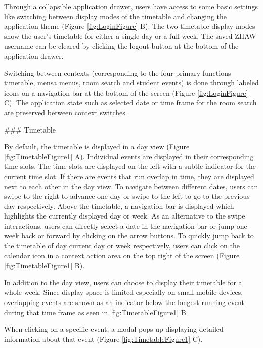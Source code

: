 \begin{markdown}
Through a collapsible application drawer, users have access to some basic settings like switching between display modes of the timetable and changing the application theme (Figure \ref{fig:LoginFigure} B). The two timetable display modes show the user's timetable for either a single day or a full week. The saved ZHAW username can be cleared by clicking the logout button at the bottom of the application drawer.

Switching between contexts (corresponding to the four primary functions timetable, mensa menus, room search and student events) is done through labeled icons on a navigation bar at the bottom of the screen (Figure \ref{fig:LoginFigure} C). The application state such as selected date or time frame for the room search are preserved between context switches.

\newpage

### Timetable

By default, the timetable is displayed in a day view (Figure \ref{fig:TimetableFigure1} A). Individual events are displayed in their corresponding time slots. The time slots are displayed on the left with a subtle indicator for the current time slot. If there are events that run overlap in time, they are displayed next to each other in the day view. To navigate between different dates, users can swipe to the right to advance one day or swipe to the left to go to the previous day respectively. Above the timetable, a navigation bar is displayed which highlights the currently displayed day or week. As an alternative to the swipe interactions, users can directly select a date in the navigation bar or jump one week back or forward by clicking on the arrow buttons. To quickly jump back to the timetable of day current day or week respectively, users can click on the calendar icon in a context action area on the top right of the screen (Figure \ref{fig:TimetableFigure1} B).

In addition to the day view, users can choose to display their timetable for a whole week. Since display space is limited especially on small mobile devices, overlapping events are shown as an indicator below the longest running event during that time frame as seen in \ref{fig:TimetableFigure1} B.

When clicking on a specific event, a modal pops up displaying detailed information about that event (Figure \ref{fig:TimetableFigure1} C).

\bigskip


\end{markdown}
